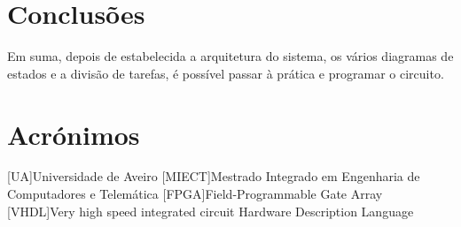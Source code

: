\documentclass[a4paper,11pt,onecolumn]{report}
\begin{document}
\chapter{Conclusões}
\label{chap.conclusao}
Em suma, depois de estabelecida a arquitetura do sistema, os vários diagramas de estados e a divisão de tarefas, é possível passar à prática e programar o circuito.


\chapter*{Acrónimos}
\begin{acronym}
[UA]{Universidade de Aveiro}
[MIECT]{Mestrado Integrado em Engenharia de Computadores e Telemática}
[FPGA]{Field-Programmable Gate Array}
[VHDL]{Very high speed integrated circuit Hardware Description Language}

\end{acronym}


\end{document}
